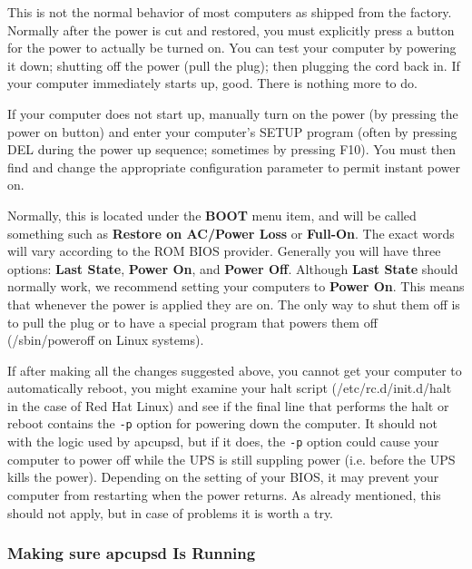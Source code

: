 This is not the normal behavior of most computers as shipped from the factory.
Normally after the power is cut and restored, you must explicitly press a
button for the power to actually be turned on. You can test your computer by
powering it down; shutting off the power (pull the plug); then plugging the
cord back in. If your computer immediately starts up, good. There is nothing
more to do.  

If your computer does not start up, manually turn on the power (by pressing
the power on button) and enter your computer's SETUP program (often by
pressing DEL during the power up sequence; sometimes by pressing F10). You
must then find and change the appropriate configuration parameter to permit
instant power on.  

Normally, this is located under the {\bf BOOT} menu item, and will be called
something such as {\bf Restore on AC/Power Loss} or {\bf Full-On}. The exact
words will vary according to the ROM BIOS provider. Generally you will have
three options: {\bf Last State}, {\bf Power On}, and {\bf Power Off}. Although
{\bf Last State} should normally work, we recommend setting your computers to
{\bf Power On}. This means that whenever the power is applied they are on. The
only way to shut them off is to pull the plug or to have a special program
that powers them off (/sbin/poweroff on Linux systems).  

If after making all the changes suggested above, you cannot get your computer
to automatically reboot, you might examine your halt script
(/etc/rc.d/init.d/halt in the case of Red Hat Linux) and see if the final line
that performs the halt or reboot contains the {\tt -p} option for powering
down the computer. It should not with the logic used by apcupsd, but if it
does, the {\tt -p} option could cause your computer to power off while the UPS
is still suppling power (i.e. before the UPS kills the power).  Depending on
the setting of your BIOS, it may prevent your computer from restarting when
the power returns. As already mentioned, this should not apply, but in case of
problems it is worth a try. 

\label{Making-sure-apcupsd-Is-Running}

\subsubsection*{Making sure apcupsd Is Running}

